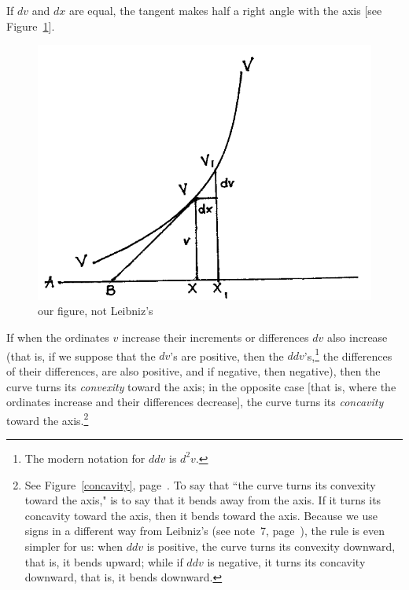 \documentclass[twoside,openright]{article}
\begin{document}
If $dv$ and $dx$ are equal, the tangent makes half a right angle with
the axis [see Figure~\ref{45deg}].
\begin{figure}[htp]
  \begin{center}
    \includegraphics[width=.65\textwidth]{fig/Figure7}
    \caption{our figure, not Leibniz's}
    \label{45deg}
  \end{center}
\end{figure} If when the ordinates $v$ increase their increments or
differences $dv$ also increase (that is, if we suppose that the $dv$'s
are positive, then the $ddv$'s,\footnote{The modern notation for $ddv$
  is $d^2v$.}  the differences of their differences, are also
positive, and if negative, then negative), then the curve turns its
{\em convexity} toward the axis; in the opposite case [that is, where
the ordinates increase and their differences decrease], the curve
turns its {\em concavity} toward the axis.\footnote{See
  Figure~\ref{concavity}, page~\pageref{concavity}.  To say that ``the
  curve turns its convexity toward the axis," is to say that it bends
  away from the axis.  If it turns its concavity toward the
  axis, then it bends toward the axis.  Because we use signs in a
  different way from Leibniz's (see note~7, page~\pageref{cnm7}), the
  rule is even simpler for us: when $ddv$ is positive, the curve turns
  its convexity downward, that is, it bends upward; while if $ddv$ is
  negative, it turns its concavity downward, that is, it bends
  downward.}
\end{document}
